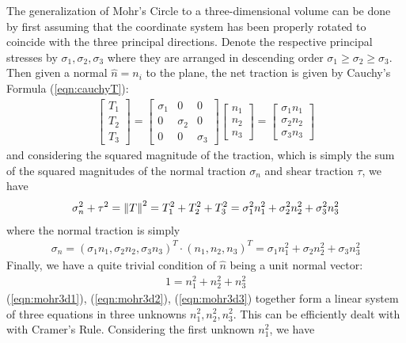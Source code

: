 The generalization of Mohr's Circle to a three-dimensional volume can be done by first assuming that the coordinate system has been properly rotated to coincide with the three principal directions. Denote the respective principal stresses by $\sigma_1, \sigma_2, \sigma_3$ where they are arranged in descending order $\sigma_1 \geq \sigma_2 \geq \sigma_3$. Then given a normal $\hat{n} = n_i$ to the plane, the net traction is given by Cauchy's Formula (\ref{eqn:cauchyT}):
\begin{align}
\begin{bmatrix}
T_1 \\
T_2 \\
T_3
\end{bmatrix}  
=
\begin{bmatrix}
\sigma_{1} & 0 & 0 \\
0 & \sigma_{2} & 0 \\
0 & 0 & \sigma_{3}
\end{bmatrix}
\begin{bmatrix}
n_1 \\
n_2 \\
n_3
\end{bmatrix}
=
\begin{bmatrix}
\sigma_1 n_1 \\
\sigma_2 n_2 \\
\sigma_3 n_3
\end{bmatrix}    
\end{align}
and considering the squared magnitude of the traction, which is simply the sum of the squared magnitudes of the normal traction $\sigma_n$ and shear traction $\tau$, we have
\begin{align}
\sigma_n^2 + \tau^2 = \norm{T}^2 = T_1^2 + T_2^2 + T_3^2 = \sigma_1^2 n_1^2 + \sigma_2^2 n_2^2 + \sigma_3^2 n_3^2 \label{eqn:mohr3d1}
\end{align}
where the normal traction is simply
\begin{align}
\sigma_n = (\sigma_1 n_1, \sigma_2 n_2, \sigma_3 n_3)^T \cdot (n_1, n_2, n_3)^T = \sigma_1n_1^2 + \sigma_2n_2^2 + \sigma_3n_3^2 \label{eqn:mohr3d2}
\end{align}
Finally, we have a quite trivial condition of $\hat{n}$ being a unit normal vector:
\begin{align}
1 = n_1^2 + n_2^2 + n_3^2 \label{eqn:mohr3d3}
\end{align}
(\ref{eqn:mohr3d1}), (\ref{eqn:mohr3d2}), (\ref{eqn:mohr3d3}) together form a linear system of three equations in three unknowns $n_1^2, n_2^2, n_3^2$. This can be efficiently dealt with with Cramer's Rule. Considering the first unknown $n_1^2$, we have
